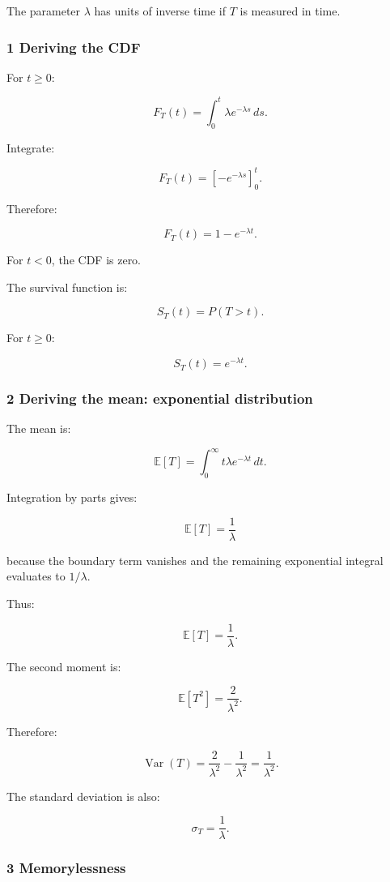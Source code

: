The parameter \(\lambda\) has units of inverse time if \(T\) is measured in time.

\subsubsection{1 Deriving the CDF}\label{02-foundations-ii-ch024-deriving-the-cdf}

For \(t\ge0\):

\[
 F_T(t)= \int_0^t\lambda e^{-\lambda s}\,ds.
\]

Integrate:

\[
 F_T(t)= \left[-e^{-\lambda s}\right]_0^t.
\]

Therefore:

\[
 \boxed{ F_T(t)=1-e^{-\lambda t} }.
\]

For \(t<0\), the CDF is zero.

The survival function is:

\[
 S_T(t)=P(T>t).
\]

For \(t\ge0\):

\[
 \boxed{ S_T(t)=e^{-\lambda t} }.
\]

\subsubsection{2 Deriving the mean: exponential distribution}\label{02-foundations-ii-ch024-deriving-the-mean-exponential-distribution}

The mean is:

\[
 \mathbb E[T]= \int_0^\infty t\lambda e^{-\lambda t}\,dt.
\]

Integration by parts gives:

\[
 \mathbb E[T] = \frac1\lambda
\]

because the boundary term vanishes and the remaining exponential integral evaluates to \(1/\lambda\).

Thus:

\[
 \boxed{ \mathbb E[T]=\frac1\lambda }.
\]

The second moment is:

\[
 \mathbb E[T^2]=\frac2{\lambda^2}.
\]

Therefore:

\[
 \operatorname{Var}(T) = \frac2{\lambda^2} -\frac1{\lambda^2} = \boxed{\frac1{\lambda^2}}.
\]

The standard deviation is also:

\[
 \sigma_T=\frac1\lambda.
\]

\subsubsection{3 Memorylessness}\label{02-foundations-ii-ch024-memorylessness}

